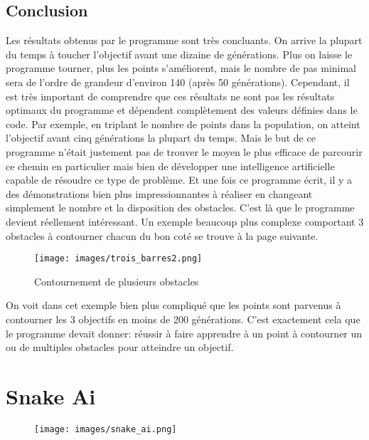 \documentclass[12pt, a4paper, openany]{book}
\begin{document}
\section{Conclusion}
Les résultats obtenus par le programme sont très concluants. On arrive la plupart du temps à toucher l'objectif avant une dizaine de générations. Plus on laisse le programme tourner, plus les points s’améliorent, mais le nombre de pas minimal sera de l'ordre de grandeur d'environ 140 (après 50 générations). Cependant, il est très important de comprendre que ces résultats ne sont pas les résultats optimaux du programme et dépendent complètement des valeurs définies dans le code. Par exemple, en triplant le nombre de points dans la population, on atteint l'objectif avant cinq générations la plupart du temps. Mais le but de ce programme n'était justement pas de trouver le moyen le plus efficace de parcourir ce chemin en particulier mais bien de développer une intelligence artificielle capable de résoudre ce type de problème. Et une fois ce programme écrit, il y a des démonstrations bien plus impressionnantes à réaliser en changeant simplement le nombre et la disposition des obstacles. C'est là que le programme devient réellement intéressant. Un exemple beaucoup plus complexe comportant 3 obstacles à contourner chacun du bon coté se trouve à la page suivante. 
\begin{figure}[H]
    \centering
    \texttt{[image: images/trois\_barres2.png]}
    \caption{Contournement de plusieurs obstacles}
\end{figure}
\noindent On voit dans cet exemple bien plus compliqué que les points sont parvenus à contourner les 3 objectifs en moins de 200 générations. \newline\newline
\indent C'est exactement cela que le programme devait donner: réussir à faire apprendre à un point à contourner un ou de multiples obstacles pour atteindre un objectif.

\newpage

\chapter{Snake Ai}
\label{r:2}
\begin{figure}[ht]
    \centering
    \texttt{[image: images/snake\_ai.png]}
\end{figure}
\newpage
\end{document}
